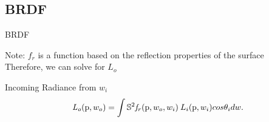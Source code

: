 \documentclass[10pt,compress,professionalfont]{beamer}
\begin{document}
\subsection{BRDF}
\begin{frame}{BRDF}

    {\centering
        Note: $f_r$ is a function based on the reflection properties of the surface \\
        \vspace{4mm}
        Therefore, we can solve for $L_o$\\
    }

    \begin{block}{Incoming Radiance from $w_i$}
    \[
        \mathit{L_o}(\textup{p}, w_o) = \int{\mathbb{S}^2} \mathit{f_r}(\textup{p}, w_o, w_i)\:L_i(\textup{p}, w_i)cos\theta_i dw.
    \]
    \end{block}

\end{frame}
\end{document}
